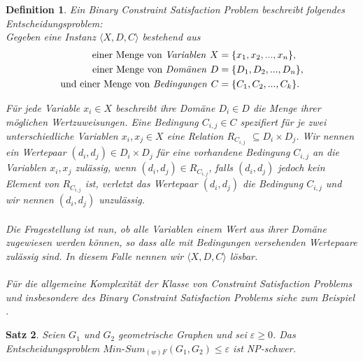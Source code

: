 \documentclass[a4paper, 12pt, twoside]{article}
\theoremstyle{Format1} %
\newtheorem{Def}{Definition}[section]       %
\newtheorem{Satz}[Def]{Satz}                %
\begin{document}
\begin{Def}
	Ein \textit{Binary Constraint Satisfaction Problem} beschreibt folgendes Entscheidungsproblem:
	\\
	Gegeben eine Instanz $\langle X,D,C \rangle$ bestehend aus
	\begin{align*}
		\text{einer Menge von \textit{Variablen }}X &= \{x_1, x_2, ..., x_n\},\\
		\text{einer Menge von \textit{Domänen }}D &= \{D_1, D_2, ..., D_n\},\\
		\text{und einer Menge von \textit{Bedingungen }}C &= \{C_1, C_2, ..., C_k\}.
	\end{align*}

	Für jede Variable $ x_i \in X$ beschreibt ihre Domäne $ D_i \in D$ die Menge ihrer möglichen Wertzuweisungen.
	Eine Bedingung $C_{i,j} \in C$ spezifiert für je zwei unterschiedliche Variablen $x_i, x_j \in X$ eine Relation $R_{C_{i,j}}$ $\subseteq D_i \times D_j$.
	Wir nennen ein Wertepaar $(d_i, d_j) \in D_i \times D_j$ für eine vorhandene Bedingung $C_{i,j}$ an die Variablen $x_i,x_j$ \textit{zulässig}, wenn $(d_i,d_j) \in R_{C_{i,j}}$,
	falls $(d_i,d_j)$ jedoch kein Element von $R_{C_{i,j}}$ ist, \textit{verletzt} das Wertepaar $(d_i, d_j)$ die Bedingung $C_{i,j}$
	und wir nennen $(d_i,d_j)$ \textit{unzulässig}.
	\\
	\\
	Die Fragestellung ist nun, ob alle Variablen einem Wert aus ihrer Domäne zugewiesen werden können, so dass alle mit Bedingungen versehenden Wertepaare zulässig sind.
	In diesem Falle nennen wir $\langle X,D,C \rangle$ \textit{lösbar}.
	\\
	\\
	Für die allgemeine Komplexität der Klasse von \textit{Constraint Satisfaction Problems} und insbesondere des
	\textit{Binary Constraint Satisfaction Problems} siehe zum Beispiel \cite{Karp}.
\end{Def}

\begin{Satz} \label{Satz NP-Schwerheit}
	Seien $G_1$ und $G_2$ geometrische Graphen und sei $\varepsilon \geq 0$.
	Das Entscheidungsproblem $\textit{Min-Sum}_{(w)F}(G_1, G_2) \leq  \varepsilon $ ist NP-schwer.
\end{Satz}
\end{document}
